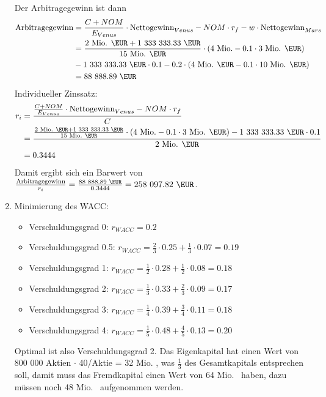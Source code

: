 \documentclass{article}
\begin{document}
\begin{enumerate}[label=(\alph*)]
		Der Arbitragegewinn ist dann
		\begin{align}
			\text{Arbitragegewinn} &= \frac{C+NOM}{E_{Venus}}\cdot\text{Nettogewinn}_{Venus} - NOM\cdot r_f - w\cdot \text{Nettogewinn}_{Mars} \notag \\
			&= \frac{2\text{ Mio. \EUR} + \text{1 333 333.33 \EUR}}{15\text{ Mio. \EUR}}\cdot (4\text{ Mio.} - 0.1\cdot 3\text{ Mio. \EUR}) \notag \\
			& - \text{1 333 333.33 \EUR} \cdot 0.1 - 0.2\cdot (4\text{ Mio. \EUR} - 0.1\cdot 10\text{ Mio. \EUR}) \notag \\
			&= \text{88 888.89 \EUR} \notag
		\end{align}
		Individueller Zinssatz:
		\begin{align}
			r_i &= \frac{\frac{C+NOM}{E_{Venus}}\cdot\text{Nettogewinn}_{Venus} - NOM\cdot r_f }{C} \notag \\
			&= \frac{\frac{2\text{ Mio. \EUR} + \text{1 333 333.33 \EUR}}{15\text{ Mio. \EUR}}\cdot (4\text{ Mio.} - 0.1\cdot 3\text{ Mio. \EUR}) - \text{1 333 333.33 \EUR} \cdot 0.1}{2 \text{ Mio. \EUR}} \notag \\
			&= 0.3444 \notag
		\end{align}
		Damit ergibt sich ein Barwert von $\frac{\text{Arbitragegewinn}}{r_i} = \frac{\text{88 888.89 \EUR}}{0.3444}=\text{258 097.82 \EUR}$.
		\item Minimierung des WACC:
		\begin{itemize}
			\item Verschuldungsgrad 0: $r_{WACC}=0.2$
			\item Verschuldungsgrad 0.5: $r_{WACC}=\frac{2}{3}\cdot 0.25 + \frac{1}{3}\cdot 0.07 = 0.19$
			\item Verschuldungsgrad 1: $r_{WACC}=\frac{1}{2}\cdot 0.28 + \frac{1}{2}\cdot 0.08 = 0.18$
			\item Verschuldungsgrad 2: $r_{WACC}=\frac{1}{3}\cdot 0.33 + \frac{2}{3}\cdot 0.09 = 0.17$
			\item Verschuldungsgrad 3: $r_{WACC}=\frac{1}{4}\cdot 0.39 + \frac{3}{4}\cdot 0.11 = 0.18$
			\item Verschuldungsgrad 4: $r_{WACC}=\frac{1}{5}\cdot 0.48 + \frac{4}{5}\cdot 0.13 = 0.20$
		\end{itemize}
		Optimal ist also Verschuldungsgrad 2. Das Eigenkapital hat einen Wert von 800 000 Aktien $\cdot$ 40\EUR/Aktie = 32 Mio. \EUR, was $\frac{1}{3}$ des Gesamtkapitals entsprechen soll, damit muss das Fremdkapital einen Wert von 64 Mio. \EUR\, haben, dazu müssen noch 48 Mio. \EUR\, aufgenommen werden.

\end{enumerate}
\end{document}
